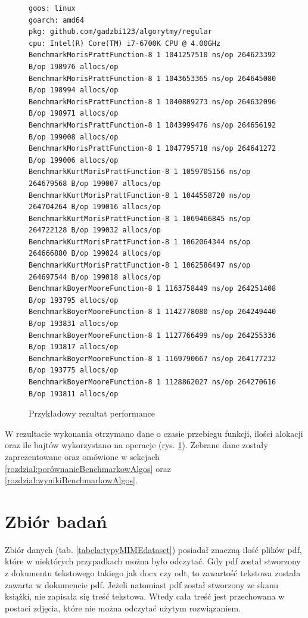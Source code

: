 \begin{figure}[htbp]
  \centering
  \begin{lstlisting}
goos: linux
goarch: amd64
pkg: github.com/gadzbi123/algorytmy/regular
cpu: Intel(R) Core(TM) i7-6700K CPU @ 4.00GHz
BenchmarkMorisPrattFunction-8 1	1041257510 ns/op 264623392 B/op 198976 allocs/op
BenchmarkMorisPrattFunction-8 1	1043653365 ns/op 264645080 B/op 198994 allocs/op
BenchmarkMorisPrattFunction-8 1	1040809273 ns/op 264632096 B/op 198971 allocs/op
BenchmarkMorisPrattFunction-8 1	1043999476 ns/op 264656192 B/op 199008 allocs/op
BenchmarkMorisPrattFunction-8 1	1047795718 ns/op 264641272 B/op 199006 allocs/op
BenchmarkKurtMorisPrattFunction-8 1	1059705156 ns/op 264679568 B/op 199007 allocs/op
BenchmarkKurtMorisPrattFunction-8 1	1044558720 ns/op 264704264 B/op 199016 allocs/op
BenchmarkKurtMorisPrattFunction-8 1	1069466845 ns/op 264722128 B/op 199032 allocs/op
BenchmarkKurtMorisPrattFunction-8 1	1062064344 ns/op 264666880 B/op 199024 allocs/op
BenchmarkKurtMorisPrattFunction-8 1	1062586497 ns/op 264697544 B/op 199018 allocs/op
BenchmarkBoyerMooreFunction-8 1	1163758449 ns/op 264251408 B/op 193795 allocs/op
BenchmarkBoyerMooreFunction-8 1	1142778080 ns/op 264249440 B/op 193831 allocs/op
BenchmarkBoyerMooreFunction-8 1	1127766499 ns/op 264255336 B/op 193817 allocs/op
BenchmarkBoyerMooreFunction-8 1	1169790667 ns/op 264177232 B/op 193775 allocs/op
BenchmarkBoyerMooreFunction-8 1	1128862027 ns/op 264270616 B/op 193811 allocs/op
  \end{lstlisting}
  \caption{Przykładowy rezultat performance}
  \label{fig:perfTestResults}
\end{figure}

W rezultacie wykonania otrzymano dane o czasie przebiegu funkcji, ilości 
alokacji oraz ile bajtów wykorzystano na operacje (rys. \ref{fig:perfTestResults}).
Zebrane dane zostały zaprezentowane oraz omówione w sekcjach 
\ref{rozdzial:porównanieBenchmarkowAlgos} oraz \ref{rozdzial:wynikiBenchmarkowAlgos}.

\section{Zbiór badań}

Zbiór danych (tab. \ref{tabela:typyMIMEdataset}) posiadał znaczną ilość 
plików pdf, które w niektórych przypadkach można było odczytać. Gdy pdf został
stworzony z dokumentu tekstowego takiego jak docx czy odt, to zawartość tekstowa
została zawarta w dokumencie pdf. Jeżeli natomiast pdf został stworzony ze skanu
książki, nie zapisała się treść tekstowa. Wtedy cała treść jest przechowana w 
postaci zdjęcia, które nie można odczytać użytym rozwiązaniem.

